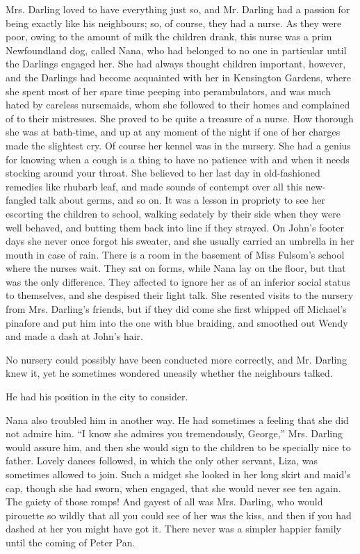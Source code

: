 Mrs. Darling loved to have everything just so, and Mr. Darling had a
passion for being exactly like his neighbours; so, of course, they had
a nurse. As they were poor, owing to the amount of milk the children
drank, this nurse was a prim Newfoundland dog, called Nana, who had
belonged to no one in particular until the Darlings engaged her. She
had always thought children important, however, and the Darlings had
become acquainted with her in Kensington Gardens, where she spent most
of her spare time peeping into perambulators, and was much hated by
careless nursemaids, whom she followed to their homes and complained of
to their mistresses. She proved to be quite a treasure of a nurse. How
thorough she was at bath-time, and up at any moment of the night if one
of her charges made the slightest cry. Of course her kennel was in the
nursery. She had a genius for knowing when a cough is a thing to have
no patience with and when it needs stocking around your throat. She
believed to her last day in old-fashioned remedies like rhubarb leaf,
and made sounds of contempt over all this new-fangled talk about germs,
and so on. It was a lesson in propriety to see her escorting the
children to school, walking sedately by their side when they were well
behaved, and butting them back into line if they strayed. On John's
footer days she never once forgot his sweater, and she usually carried
an umbrella in her mouth in case of rain. There is a room in the
basement of Miss Fulsom's school where the nurses wait. They sat on
forms, while Nana lay on the floor, but that was the only difference.
They affected to ignore her as of an inferior social status to
themselves, and she despised their light talk. She resented visits to
the nursery from Mrs. Darling's friends, but if they did come she first
whipped off Michael's pinafore and put him into the one with blue
braiding, and smoothed out Wendy and made a dash at John's hair.

No nursery could possibly have been conducted more correctly, and Mr.
Darling knew it, yet he sometimes wondered uneasily whether the
neighbours talked.

He had his position in the city to consider.

Nana also troubled him in another way.
He had sometimes a feeling that she did not admire him.
``I know she admires you tremendously, George,'' Mrs. Darling would assure him, and then she would sign to the children to be specially nice to father.
Lovely dances followed, in which the only other servant, Liza, was sometimes allowed to join.
Such a midget she looked in her long skirt and maid's cap, though she had sworn, when engaged, that she would never see ten again.
The gaiety of those romps!
And gayest of all was Mrs. Darling, who would pirouette so wildly that all you could see of her was the kiss, and then if you had dashed at her you might have got it.
There never was a simpler happier family until the coming of Peter Pan.

